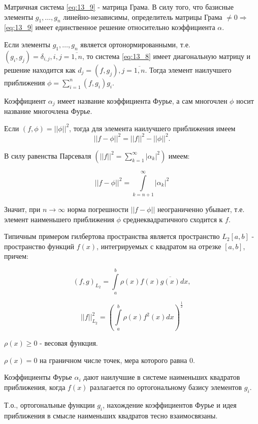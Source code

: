 Матричная система \eqref{eq:13_9} - матрица Грама. В силу того, что базисные элементы $g_1, \ldots, g_n$ линейно-независимы, определитель матрицы Грама $\ne 0 \Rightarrow$ \eqref{eq:13_9} имеет единственное решение относительно коэффициента $\alpha$.

\begin{notes}
  \item Если элементы $g_1, \ldots, g_n$ является ортонормированными, т.е. $(g_i, g_j) = \delta_{i, j}, i, j = \overline{1,n}$, то система \eqref{eq:13_8} имеет диагональную матрицу и решение находится как $d_j = (f, g_j), j = \overline{1, n}$. Тогда элемент наилучшего приближения $\phi = \sum\limits_{i=1}^n (f, g_i)g_i$.

  Коэффициент $\alpha_j$ имеет название коэффициента Фурье, а сам многочлен $\phi$ носит название многочлена Фурье.

  \item Если $(f, \phi) = || \phi ||^2$, тогда для элемента наилучшего приближения имеем
  \begin{equation*}
    ||f - \phi||^2 = ||f||^2 - ||\phi||^2.
  \end{equation*}

  В силу равенства Парсеваля $\left( ||f||^2 = \sum\limits_{k=1}^\infty |\alpha_k|^2 \right)$ имеем:

  \begin{equation*}
    ||f - \phi||^2 = \int\limits_{k = n + 1}^{
    \infty
    } |\alpha_k|^2
  \end{equation*}

  Значит, при $n \to \infty$ норма погрешности $|| f - \phi||$ неограниченно убывает, т.е. элемент наименьшего приближения $\phi$ среднеквадратичного сходится к $f$.

  \item Типичным примером гилбертова пространства является пространство $L_2 [a, b]$ - пространство функций $f(x)$, интегрируемых с квадратом на отрезке $[a, b]$, причем:

  \begin{equation*}
  (f, g)_{L_2} = \int\limits_a^b \rho(x) f(x) \overline{g(x)} dx,
  \end{equation*}

  \begin{equation*}
    \left| \left| f \right| \right|_{L_2}^2 = \left( \int\limits_a^b \rho(x) f^2(x) dx \right)^{\frac{1}{2}}
  \end{equation*}

  $\rho(x) \geqslant 0$ - весовая функция.

  $\rho(x) = 0$ на граничном числе точек, мера которого равна 0.

  \item Коэффициенты Фурье $\alpha_i$ дают наилучшие в системе наименьших квадратов приближения, когда $f(x)$ разлагается по ортогональному базису элементов $g_i$.

  Т.о., ортогональные функции $g_i$, нахождение коэффициентов Фурье и идея приближения в смысле наименьших квадратов тесно взаимосвязаны.
\end{notes}
